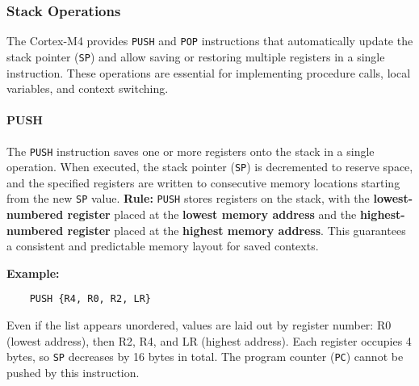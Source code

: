 \subsubsection{Stack Operations}

The Cortex-M4 provides \texttt{PUSH} and \texttt{POP} instructions that automatically update the stack pointer (\texttt{SP}) and allow saving or restoring multiple registers in a single instruction.  
These operations are essential for implementing procedure calls, local variables, and context switching.
\paragraph{PUSH}

The \texttt{PUSH} instruction saves one or more registers onto the stack in a single operation.
When executed, the stack pointer (\texttt{SP}) is decremented to reserve space, and the specified registers are written to consecutive memory locations starting from the new \texttt{SP} value.
\textbf{Rule:} \texttt{PUSH} stores registers on the stack, with the \textbf{lowest-numbered register} placed at the \textbf{lowest memory address} and the \textbf{highest-numbered register} placed at the \textbf{highest memory address}.
This guarantees a consistent and predictable memory layout for saved contexts.

\medskip
\noindent
\textbf{Example:}
\begin{lstlisting}
    PUSH {R4, R0, R2, LR}
\end{lstlisting}

Even if the list appears unordered, values are laid out by register number: R0 (lowest address), then R2, R4, and LR (highest address).
Each register occupies 4 bytes, so \texttt{SP} decreases by 16 bytes in total.
The program counter (\texttt{PC}) cannot be pushed by this instruction.

